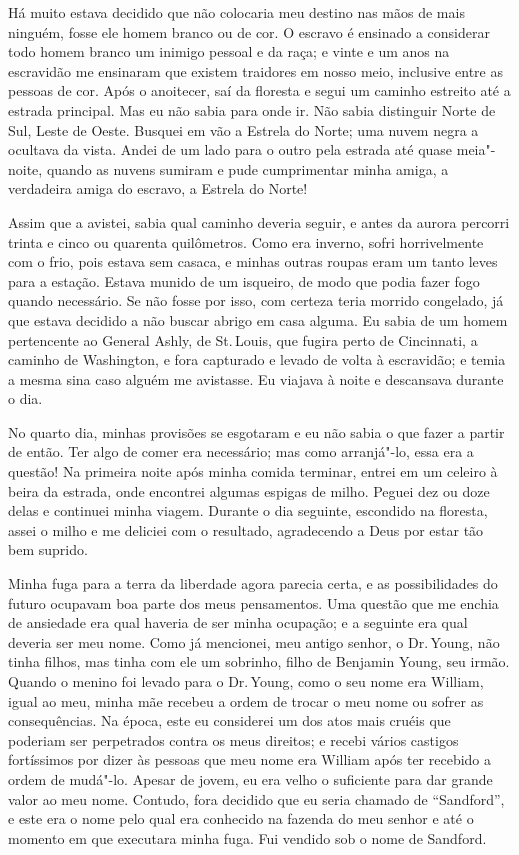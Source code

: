 Há muito estava decidido que não colocaria meu destino nas mãos de mais
ninguém, fosse ele homem branco ou de cor. O escravo é ensinado a
considerar todo homem branco um inimigo pessoal e da raça; e vinte e um
anos na escravidão me ensinaram que existem traidores em nosso meio,
inclusive entre as pessoas de cor. Após o anoitecer, saí da floresta e
segui um caminho estreito até a estrada principal. Mas eu não sabia para
onde ir. Não sabia distinguir Norte de Sul, Leste de Oeste. Busquei em
vão a Estrela do Norte; uma nuvem negra a ocultava da vista. Andei de um
lado para o outro pela estrada até quase meia"-noite, quando as nuvens
sumiram e pude cumprimentar minha amiga, a verdadeira amiga do escravo,
a Estrela do Norte!

Assim que a avistei, sabia qual caminho deveria seguir, e antes da
aurora percorri trinta e cinco ou quarenta quilômetros. Como era
inverno, sofri horrivelmente com o frio, pois estava sem casaca, e
minhas outras roupas eram um tanto leves para a estação. Estava munido
de um isqueiro, de modo que podia fazer fogo quando necessário. Se não
fosse por isso, com certeza teria morrido congelado, já que estava
decidido a não buscar abrigo em casa alguma. Eu sabia de um homem
pertencente ao General Ashly, de St.\,Louis, que fugira perto de
Cincinnati, a caminho de Washington, e fora capturado e levado de volta
à escravidão; e temia a mesma sina caso alguém me avistasse. Eu viajava
à noite e descansava durante o dia.

No quarto dia, minhas provisões se esgotaram e eu não sabia o que fazer
a partir de então. Ter algo de comer era necessário; mas como
arranjá"-lo, essa era a questão! Na primeira noite após minha comida
terminar, entrei em um celeiro à beira da estrada, onde encontrei
algumas espigas de milho. Peguei dez ou doze delas e continuei minha
viagem. Durante o dia seguinte, escondido na floresta, assei o milho e
me deliciei com o resultado, agradecendo a Deus por estar tão bem
suprido.

Minha fuga para a terra da liberdade agora parecia certa, e as
possibilidades do futuro ocupavam boa parte dos meus pensamentos. Uma
questão que me enchia de ansiedade era qual haveria de ser minha
ocupação; e a seguinte era qual deveria ser meu nome. Como já mencionei,
meu antigo senhor, o Dr.\,Young, não tinha filhos, mas tinha com ele um
sobrinho, filho de Benjamin Young, seu irmão. Quando o menino foi levado
para o Dr.\,Young, como o seu nome era William, igual ao meu, minha mãe
recebeu a ordem de trocar o meu nome ou sofrer as consequências. Na
época, este eu considerei um dos atos mais cruéis que poderiam ser
perpetrados contra os meus direitos; e recebi vários castigos
fortíssimos por dizer às pessoas que meu nome era William após ter
recebido a ordem de mudá"-lo. Apesar de jovem, eu era velho o suficiente
para dar grande valor ao meu nome. Contudo, fora decidido que eu seria
chamado de ``Sandford'', e este era o nome pelo qual era conhecido na
fazenda do meu senhor e até o momento em que executara minha fuga. Fui
vendido sob o nome de Sandford.

